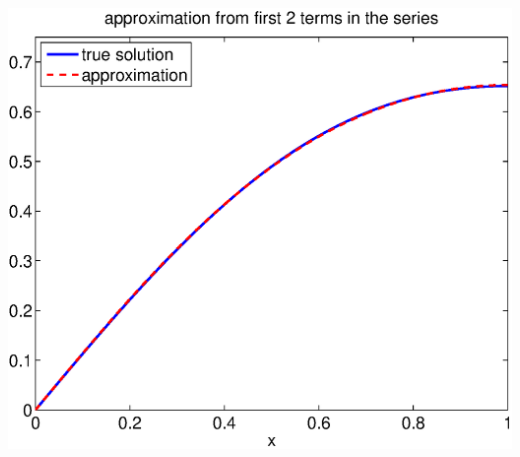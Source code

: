 \begin{solution}
\begin{enumerate}
\begin{center}
   \includegraphics[scale=0.4]{bvps_2}


\end{center}
\end{enumerate}
\end{solution}
